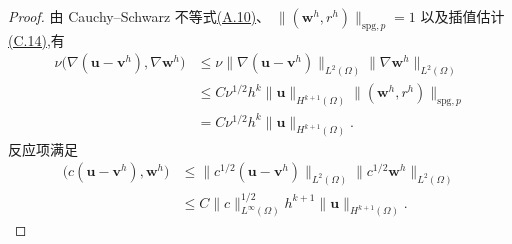 \begin{proof}
由 Cauchy--Schwarz 不等式\hyperref[eq:appendix-a-10]{(A.10)}、
$\|(\bm{w}^h,r^h)\|_{\mathrm{spg},p}=1$ 以及插值估计
\hyperref[eq:interpolation-error-estimate]{(C.14)},有
\begin{equation}\label{eq:oseen-spg-error-diffusion}
\begin{aligned}
 \nu\bigl(\nabla(\bm{u}-\bm{v}^h),\nabla\bm{w}^h\bigr)
 &\le\nu\|\nabla(\bm{u}-\bm{v}^h)\|_{L^2(\Omega)}
             \|\nabla\bm{w}^h\|_{L^2(\Omega)}\\
 &\le C\nu^{1/2}h^k\|\bm{u}\|_{H^{k+1}(\Omega)}
       \|(\bm{w}^h,r^h)\|_{\mathrm{spg},p}\\
 &=C\nu^{1/2}h^k\|\bm{u}\|_{H^{k+1}(\Omega)}.
\end{aligned}
\end{equation}
反应项满足
\begin{equation}\label{eq:oseen-spg-error-reaction}
\begin{aligned}
 \bigl(c(\bm{u}-\bm{v}^h),\bm{w}^h\bigr)
 &\le\|c^{1/2}(\bm{u}-\bm{v}^h)\|_{L^2(\Omega)}
       \|c^{1/2}\bm{w}^h\|_{L^2(\Omega)}\\
 &\le C\|c\|_{L^\infty(\Omega)}^{1/2}h^{k+1}
       \|\bm{u}\|_{H^{k+1}(\Omega)}.
\end{aligned}
\end{equation}


\end{proof}
